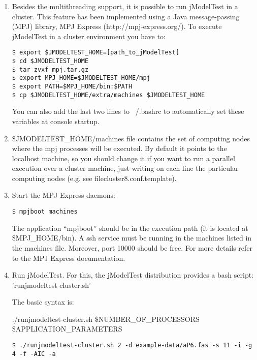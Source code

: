 \documentclass[11pt,twoside,a4paper]{article}
\begin{document}
\begin{enumerate}
\item Besides the multithreading support, it is possible to run jModelTest in a cluster. This feature has been implemented using a Java message-passing (MPJ) library, MPJ Express (http://mpj-express.org/). To execute jModelTest in a cluster environment you have to:

\begin{lstlisting}
$ export $JMODELTEST_HOME=[path_to_jModelTest]
$ cd $JMODELTEST_HOME
$ tar zvxf mpj.tar.gz
$ export MPJ_HOME=$JMODELTEST_HOME/mpj
$ export PATH=$MPJ_HOME/bin:$PATH
$ cp $JMODELTEST_HOME/extra/machines $JMODELTEST_HOME
\end{lstlisting}

You can also add the last two lines to ~/.bashrc to automatically set these variables at console startup.

\item \$JMODELTEST\_HOME/machines file contains the set of computing nodes where the mpj processes will be executed. By default it points to the localhost machine, so you should change it if you want to run a parallel execution over a cluster machine, just writing on each line the particular computing nodes (e.g. see filecluster8.conf.template).

\item Start the MPJ Express daemons:

\begin{lstlisting}
$ mpjboot machines
\end{lstlisting}

The application ``mpjboot'' should be in the execution path (it is located at \$MPJ\_HOME/bin). A ssh service must be running in the machines listed in the machines file. Moreover, port 10000 should be free. For more details refer to the MPJ Express documentation.

\item Run jModelTest. For this, the jModelTest distribution provides a bash script: 'runjmodeltest-cluster.sh'

The basic syntax is:

./runjmodeltest-cluster.sh \$NUMBER\_OF\_PROCESSORS \$APPLICATION\_PARAMETERS

\begin{lstlisting}
$ ./runjmodeltest-cluster.sh 2 -d example-data/aP6.fas -s 11 -i -g 4 -f -AIC -a
\end{lstlisting}

\end{enumerate}
\end{document}
